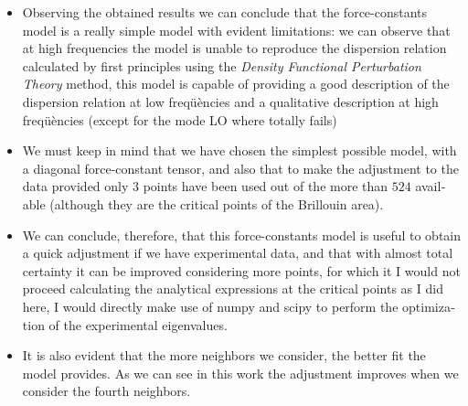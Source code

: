 \documentclass[12pt]{article} %
\begin{document}
\begin{otherlanguage}{english}\itshape

\noindent \begin{itemize}

\item Observing the obtained results we can conclude that the force-constants model is a really simple model with evident limitations: we can observe that at high frequencies the model is unable to reproduce the dispersion relation calculated by first principles using the \emph{Density Functional Perturbation Theory} method, this model is capable of providing a good description of the  dispersion relation at low freqüències and a qualitative description at high freqüències (except for the mode LO where totally fails)

\item We must keep in mind that we have chosen the simplest possible model, with a diagonal force-constant tensor, and also that to make the adjustment to the data provided  only $3$ points have been used out of the more than  $524$ available (although they are the critical points of the Brillouin area).

\item We can conclude, therefore, that this force-constants model is useful to obtain a quick adjustment if we have experimental data, and that with almost total certainty it can be improved considering more points, for which it I would not proceed calculating the analytical expressions at the critical points as I did here, I would directly make use of numpy and scipy to perform the optimization of the experimental eigenvalues.


\item It is also evident that the more neighbors we consider, the better fit the model provides. As we can see in this work the adjustment improves when we consider the fourth neighbors.
\end {itemize}

\end{otherlanguage}




\end{document}
